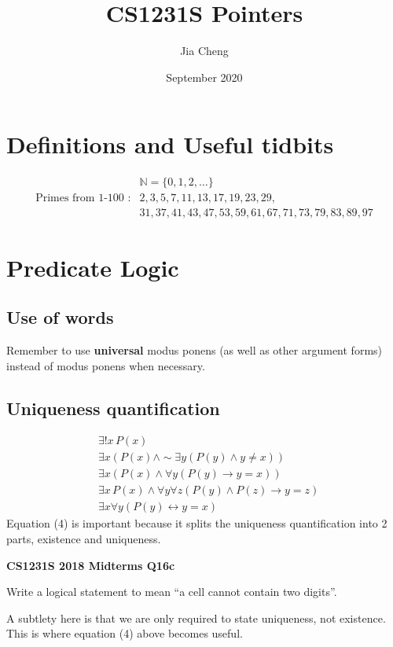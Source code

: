 \documentclass{article}
\title{CS1231S Pointers}
\author{Jia Cheng}
\date{September 2020}
\begin{document}
\maketitle

\section{Definitions and Useful tidbits}
\begin{align*}
    &\mathbb{N} = \{0,1,2,\dots\}\\
    \text{Primes from 1-100 }: &2, 3, 5, 7, 11, 13, 17, 19, 23, 29, \\
    &31, 37, 41, 43, 47, 53, 59, 61, 67, 71, 73, 79, 83, 89, 97 
\end{align*}

\section{Predicate Logic}
\subsection{Use of words}
Remember to use \textbf{universal} modus ponens (as well as other argument forms) instead of modus ponens when necessary.

\subsection{Uniqueness quantification}
\begin{align}
    &\exists! x\, P(x)\\
    &\exists x(P(x)\land \sim \exists y(P(y)\land y\neq x))\\
    &\exists x(P(x)\land \forall y(P(y)\rightarrow y=x))\\
    &\exists x\, P(x)\land \forall y\forall z(P(y)\land P(z)\rightarrow y=z)\\
    &\exists x\forall y(P(y)\leftrightarrow y=x)
\end{align}
Equation (4) is important because it splits the uniqueness quantification into 2 parts, existence and uniqueness.

\textbf{CS1231S 2018 Midterms Q16c}

Write a logical statement to mean “a cell cannot contain two digits”.

A subtlety here is that we are only required to state uniqueness, not existence. This is where equation (4) above becomes useful.
\end{document}
